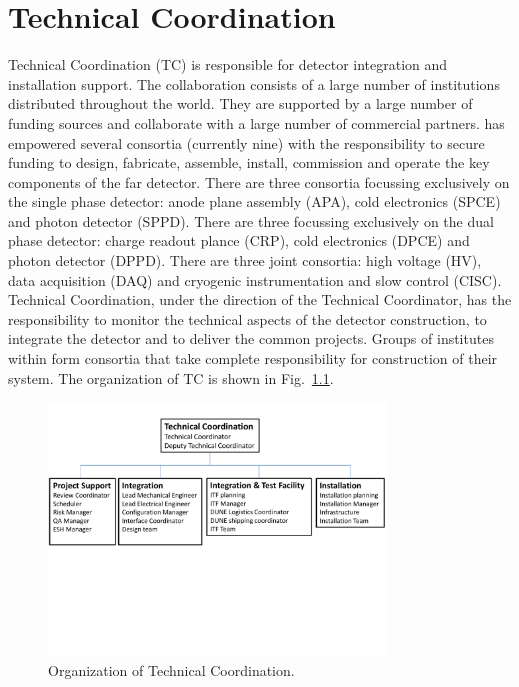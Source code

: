 \chapter{Technical Coordination}
\label{ch:fdsp-coord}

Technical Coordination (TC) is responsible for detector integration
and installation support. 
The  collaboration consists of a large number of
institutions distributed throughout the world. They are supported by a
large number of funding sources and collaborate with a large number of
commercial partners.  has empowered several consortia
(currently nine) with the responsibility to secure funding to design,
fabricate, assemble, install, commission and operate the key
components of the  far detector. There are three consortia
focussing exclusively on the single phase detector: anode plane
assembly (APA), cold electronics (SPCE) and photon detector
(SPPD). There are three focussing exclusively on the dual phase
detector: charge readout plance (CRP), cold electronics (DPCE) and
photon detector (DPPD). There are three joint consortia: high voltage
(HV), data acquisition (DAQ) and cryogenic instrumentation and slow
control (CISC).   Technical Coordination, under the
direction of the  Technical Coordinator, has the
responsibility to monitor the technical aspects of the detector
construction, to integrate the detector and to deliver the common
projects. Groups of institutes within  form consortia that
take complete responsibility for construction of their system. The
organization of TC is shown in Fig.~\ref{fig:TC_orgchart}.
\begin{figure}[htb]
  \begin{center}
    \includegraphics[width=0.8\textwidth]{far-detector-generic/figures/TP_TC_Org_Chart}
    \caption{Organization of Technical Coordination.}
    \label{fig:TC_orgchart}
  \end{center}
\end{figure}
